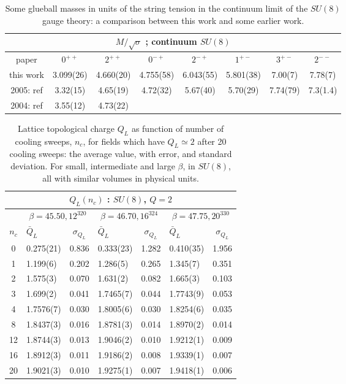 \documentclass[12pt]{article}
\begin{document}
\begin{table}[htb]
\centering
\begin{tabular}{|c|c|c|c|c|c|c|c|} \hline
\multicolumn{8}{|c|}{$M/\surd\sigma$ ; continuum $SU(8)$} \\ \hline
  paper     & $0^{++}$ & $2^{++}$ & $0^{-+}$ & $2^{-+}$ & $1^{+-}$ & $3^{+-}$ & $2^{--}$    \\ \hline
 this work                 & 3.099(26)  & 4.660(20) & 4.755(58) & 6.043(55) & 5.801(38) & 7.00(7)  & 7.78(7)  \\
 2005: ref\cite{HM_Thesis} & 3.32(15)   & 4.65(19)  & 4.72(32)  & 5.67(40)  & 5.70(29)  & 7.74(79) & 7.3(1.4)  \\
 2004: ref\cite{BLMTUW_N}  & 3.55(12)   & 4.73(22) &  &  &  &   &   \\  \hline
\end{tabular}
\caption{Some glueball masses in units of the string tension in the continuum limit of the $SU(8)$ gauge theory:
  a comparison between this work and some earlier work.}
\label{table_MK_J_SU8_comp}
\end{table}




\begin{table}[htb]
\centering
\begin{tabular}{|c|lc|lc|lc|} \hline
\multicolumn{7}{|c|}{$Q_L(n_c)$ : $SU(8)$, $Q=2$} \\ \hline
       & \multicolumn{2}{|c|}{$\beta=45.50,12^320$} & \multicolumn{2}{|c|}{$\beta=46.70,16^324$} & \multicolumn{2}{|c|}{$\beta=47.75,20^330$}  \\
 $n_c$ &  $\bar{Q}_L$ &  $\sigma_{Q_{L}}$ & $\bar{Q}_L$ & $\sigma_{Q_{L}}$  & $\bar{Q}_L$ & $\sigma_{Q_{L}}$ \\ \hline
  0   & 0.275(21) & 0.836 & 0.333(23) & 1.282 &  0.410(35) & 1.956  \\
  1   & 1.199(6)  & 0.202 & 1.286(5)  & 0.265 &  1.345(7)  & 0.351  \\
  2   & 1.575(3)  & 0.070 & 1.631(2)  & 0.082 &  1.665(3)  & 0.103  \\
  3   & 1.699(2)  & 0.041 & 1.7465(7) & 0.044 &  1.7743(9) & 0.053  \\
  4   & 1.7576(7) & 0.030 & 1.8005(6) & 0.030 &  1.8254(6) & 0.035  \\
  8   & 1.8437(3) & 0.016 & 1.8781(3) & 0.014 &  1.8970(2) & 0.014  \\
  12  & 1.8744(3) & 0.013 & 1.9046(2) & 0.010 &  1.9212(1) & 0.009  \\ 
  16  & 1.8912(3) & 0.011 & 1.9186(2) & 0.008 &  1.9339(1) & 0.007  \\ 
  20  & 1.9021(3) & 0.010 & 1.9275(1) & 0.007 &  1.9418(1) & 0.006  \\   \hline
\end{tabular}
\caption{Lattice topological charge $Q_L$ as function of number of cooling sweeps, $n_c$, for fields
  which have $Q_L\simeq 2$ after 20 cooling sweeps: the average value, with error, and standard deviation.
  For small, intermediate and large $\beta$, in $SU(8)$, all with similar volumes in physical units.}
\label{table_Q_nc_SU8}
\end{table}
\end{document}
